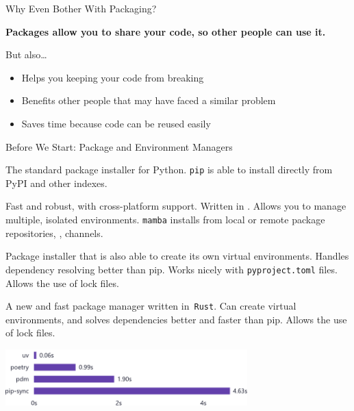 \begin{frame}{Why Even Bother With Packaging?}
  \begin{center}
    \huge\textcolor{ccyan!90!cblack}{\textbf{Packages allow you to share your code, so other people can use it.}}
  \end{center}
  \vspace{2em}
  \textcolor{cpink}{But also\dots}
  \begin{itemize}
    \setlength{\itemsep}{1em}
    \item Helps you keeping your code from breaking
    \item Benefits other people that may have faced a similar problem
    \item Saves time because code can be reused easily
  \end{itemize}
\end{frame}

\begin{frame}{Before We Start: Package and Environment Managers}
  \begin{description}
    \setlength{\itemsep}{1em}
    \item [\iref{https://pypi.org/project/pip/}{pip}] The standard package installer for Python. \texttt{pip} is able to install
      directly from PyPI and other indexes.
    \item [\iref{https://mamba.readthedocs.io/en/latest/}{mamba}] Fast and robust, with cross-platform support. Written in \cpp.
      Allows you to manage multiple, isolated environments. \texttt{mamba} installs from local or remote package repositories, \eg, channels.
    \item [\iref{https://python-poetry.org/}{poetry}] Package installer that is also able to create its own virtual environments.
      Handles dependency resolving better than pip. Works nicely with \texttt{pyproject.toml} files. Allows the use of lock files.
    \item [\iref{https://docs.astral.sh/uv/}{uv}] A new and fast package manager written in {\footnotesize{\faRust}}\,\texttt{Rust}. Can create
      virtual environments, and solves dependencies better and faster than pip. Allows the use of lock files.
  \end{description}
  \begin{center}
    \includegraphics[width=0.7\textwidth]{graphics/speed.pdf}
  \end{center}
\end{frame}




